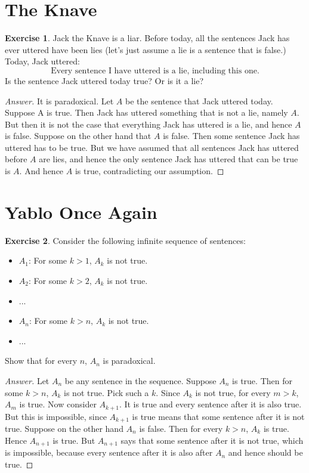 \documentclass[11pt]{article}
\theoremstyle{definition}
\newtheorem{exer}{Exercise}
\begin{document}
\section{The Knave}

\begin{exer}
Jack the Knave is a liar. Before today, all the sentences Jack has ever uttered have been lies (let's just assume a lie is a sentence that is false.) Today, Jack uttered:
$$\text{Every sentence I have uttered is a lie, including this one.}$$
Is the sentence Jack uttered today true? Or is it a lie?
\end{exer}

\begin{proof}[Answer]
It is paradoxical. Let $A$ be the sentence that Jack uttered today. Suppose A is true. Then Jack has uttered something that is not a lie, namely $A$. But then it is not the case that everything Jack has uttered is a lie, and hence $A$ is false. Suppose on the other hand that $A$ is false. Then some sentence Jack has uttered has to be true. But we have assumed that all sentences Jack has uttered before $A$ are lies, and hence the only sentence Jack has uttered that can be true is $A$. And hence $A$ is true, contradicting our assumption.

\end{proof}

\section{Yablo Once Again}

\begin{exer}
Consider the following infinite sequence of sentences:
\begin{itemize}
    \item [] $A_1$: For some $k > 1$,  $A_k$ is not true.
    \item [] $A_2$: For some $k > 2$,  $A_k$ is not true.
    \item [] ...
    \item [] $A_n$: For some $k > n$, $A_k$ is not true.
    \item [] ...
\end{itemize}
Show that for every $n$, $A_n$ is paradoxical.
\end{exer}

\begin{proof}[Answer]
Let $A_n$ be any sentence in the sequence. Suppose $A_n$ is true. Then for some $k > n$, $A_k$ is not true. Pick such a $k$. Since $A_k$ is not true, for every $m > k$, $A_m$ is true. Now consider $A_{k+1}$. It is true and every sentence after it is also true. But this is impossible, since $A_{k+1}$ is true means that some sentence after it is not true. Suppose on the other hand $A_n$ is false. Then for every $k > n$, $A_k$ is true. Hence $A_{n+1}$ is true. But $A_{n+1}$ says that some sentence after it is not true, which is impossible, because every sentence after it is also after $A_n$ and hence should be true.

\end{proof}
\end{document}
